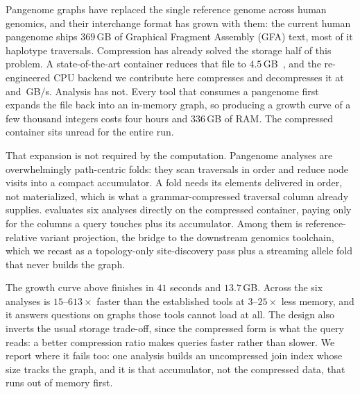 Pangenome graphs have replaced the single reference genome across human genomics,
and their interchange format has grown with them: the current human pangenome
ships $369$\,GB of Graphical Fragment Assembly (GFA) text, most of it haplotype
traversals. Compression has already solved the storage half of this problem. A
state-of-the-art container reduces that file to $4.5$\,GB~\cite{gfaz2026}, and the
re-engineered CPU backend we contribute here compresses and decompresses it at
 and \,GB/s. Analysis has not. Every tool that consumes a
pangenome first expands the file back into an in-memory graph, so producing a
growth curve of a few thousand integers costs four hours and $336$\,GB of RAM. The
compressed container sits unread for the entire run.

That expansion is not required by the computation. Pangenome analyses are
overwhelmingly path-centric folds: they scan traversals in order and reduce node
visits into a compact accumulator. A fold needs its elements delivered in order,
not materialized, which is what a grammar-compressed traversal column already
supplies. \sys evaluates six analyses directly on the compressed container, paying
only for the columns a query touches plus its accumulator. Among them is
reference-relative variant projection, the bridge to the downstream genomics
toolchain, which we recast as a topology-only site-discovery pass plus a streaming
allele fold that never builds the graph.

The growth curve above finishes in $41$ seconds and $13.7$\,GB. Across the six
analyses \sys is $15$--$613\times$ faster than the established tools at
$3$--$25\times$ less memory, and it answers questions on graphs those tools cannot
load at all. The design also inverts the usual storage trade-off, since the
compressed form is what the query reads: a better compression ratio makes queries
faster rather than slower. We report where it fails too: one analysis builds an
uncompressed join index whose size tracks the graph, and it is that accumulator,
not the compressed data, that runs out of memory first.

